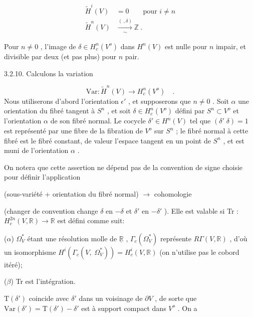 \begin{equation*}
\begin{aligned} \widetilde{H}^i(V) &= 0 \qquad \text{pour } i \neq n \\ \widetilde{H}^n(V) &\xrightarrow[\sim]{(\ , \delta)} \mathbb{Z} \ . \end{aligned}
\end{equation*}


Pour $n \neq 0$ , l'image de $\delta \in H^n_c(V^o)$ dans $H^n(V)$ est nulle pour $n$ impair, et divisible par deux (et pas plus) pour $n$ pair.


3.2.10. Calculons la variation

\begin{equation*}
\mathrm{Var} : \widetilde{H}^n(V) \longrightarrow H^n_c(V^o) \quad .
\end{equation*}
Nous utiliserons d'abord l'orientation $\epsilon'$ , et supposerons que $n \neq 0$ . Soit $\alpha$ une orientation du fibré tangent à $S^n$ , et soit $\delta \in H^n_c(V^o)$ défini par $S^n \subset V^o$ et l'orientation $\alpha$ de son fibré normal. Le cocycle $\delta' \in H^n(V)$ tel que $(\delta' \; \delta) = 1$ est représenté par une fibre de la fibration de $V^o$ sur $S^n$ ; le fibré normal à cette fibré est le fibré constant, de valeur l'espace tangent en un point de $S^n$ , et est muni de l'orientation $\alpha$ .

On notera que cette assertion ne dépend pas de la convention de signe choisie pour définir l'application

(sous-variété + orientation du fibré normal) $\longrightarrow$ cohomologie

(changer de convention change $\delta$ en $-\delta$ et $\delta'$ en $-\delta'$ ). Elle est valable si Tr : $H^{2n}_c(V, \mathbb{R}) \longrightarrow \mathbb{R}$ est défini comme suit:

($\alpha$) $\Omega^*_V$ étant une résolution molle de $\underline{\mathbb{R}}$ , $\Gamma_c(\Omega^*_V)$ représente $R\Gamma(V, \mathbb{R})$ , d'où un isomorphisme $H^i(\Gamma_c(V, \; \Omega^*_V)) = H^i_c(V, \mathbb{R})$ (on n'utilise pas le cobord itéré);

($\beta$) Tr est l'intégration.

$\mathrm{T}(\delta')$ coincide avec $\delta'$ dans un voisinage de $\partial V$ , de sorte que $\mathrm{Var}(\delta') = \mathrm{T}(\delta') - \delta'$ est à support compact dans $V^o$ . On a


